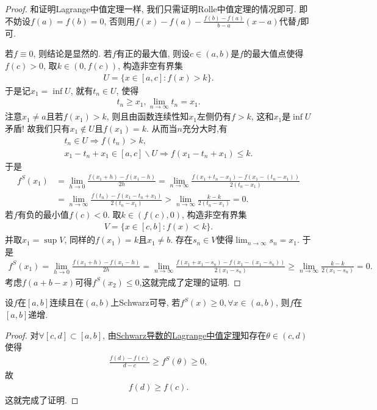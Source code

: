 \documentclass[../../main.tex]{subfiles}%
\begin{document}
\begin{proof}
和证明Lagrange中值定理一样, 我们只需证明Rolle中值定理的情况即可. 即不妨设$f(a) = f(b) = 0$, 否则用$f(x) - f(a) - \frac{f(b)-f(a)}{b - a}(x - a)$代替$f$即可.

若$f \equiv 0$, 则结论是显然的. 若$f$有正的最大值, 则设$c \in (a,b)$是$f$的最大值点使得$f(c) > 0$, 取$k \in (0,f(c))$, 构造非空有界集
\begin{align*}
U = \{x \in [a,c] : f(x) > k\}.
\end{align*}
于是记$x_1 = \inf U$, 就有$t_n \in U$, 使得
\begin{align*}
t_n \geqslant x_1, \lim_{n \to \infty} t_n = x_1.
\end{align*}
注意$x_1 \neq a$且若$f(x_1) > k$, 则且由函数连续性知$x_1$左侧仍有$f > k$, 这和$x_1$是$\inf U$矛盾! 故我们只有$x_1 \notin U$且$f(x_1) = k$.
从而当$n$充分大时,有
\begin{gather*}
t_n\in U\Longrightarrow f\left( t_n \right) >k,
\\
x_1-t_n+x_1\in \left[ a,c \right] \backslash U\Longrightarrow f\left( x_1-t_n+x_1 \right) \leqslant k.
\end{gather*}
于是
\begin{align*}
f^S(x_1)&=\lim_{h\rightarrow 0} \frac{f\left( x_1+h \right) -f\left( x_1-h \right)}{2h}=\lim_{n\rightarrow \infty} \frac{f\left( x_1+t_n-x_1 \right) -f\left( x_1-\left( t_n-x_1 \right) \right)}{2\left( t_n-x_1 \right)}
\\
&=\lim_{n\rightarrow \infty} \frac{f\left( t_n \right) -f\left( x_1-t_n+x_1 \right)}{2\left( t_n-x_1 \right)}>\lim_{n\rightarrow \infty} \frac{k-k}{2\left( t_n-x_1 \right)}=0.
\end{align*}
若$f$有负的最小值$f(c) < 0$. 取$k \in (f(c),0)$, 构造非空有界集
\begin{align*}
V = \{x \in [c,b] : f(x) < k\}.
\end{align*}
并取$x_1 = \sup V$, 同样的$f(x_1) = k$且$x_1 \neq b$. 存在$s_n \in V$使得$\lim_{n \to \infty} s_n = x_1$. 于是
\begin{align*}
f^S(x_1) = \lim_{h \to 0} \frac{f(x_1 + h) - f(x_1 - h)}{2h} = \lim_{n \to \infty} \frac{f(x_1 + x_1 - s_n) - f(x_1 - (x_1 - s_n))}{2(x_1 - s_n)} \geqslant \lim_{n \to \infty} \frac{k - k}{2(x_1 - s_n)} = 0.
\end{align*}
考虑$f(a + b - x)$可得$f^S(x_2)\leqslant 0$,这就完成了定理的证明.
\end{proof}

\begin{proposition}
设$f$在$[a,b]$连续且在$(a,b)$上Schwarz可导, 若$f^S(x) \geqslant  0, \forall x \in (a,b)$, 则$f$在$[a,b]$递增.
\end{proposition}
\begin{proof}
对$\forall [c,d] \subset [a,b]$, 由\hyperref[theorem:Schwarz导数的Lagrange中值定理]{Schwarz导数的Lagrange中值定理}知存在$\theta \in (c,d)$使得
\begin{align*}
\frac{f(d) - f(c)}{d - c} \geqslant f^S(\theta) \geqslant 0,
\end{align*}
故
\begin{align*}
f(d) \geqslant f(c).
\end{align*}
这就完成了证明.
\end{proof}
\end{document}
